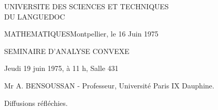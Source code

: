 UNIVERSITE DES SCIENCES ET TECHNIQUES\\
DU LANGUEDOC

MATHEMATIQUES\hfill Montpellier, le 16 Juin 1975

SEMINAIRE D'ANALYSE CONVEXE

Jeudi 19 juin 1975, à 11 h, Salle 431

Mr A. BENSOUSSAN - Professeur, Université Paris IX Dauphine.

Diffusions réfléchies.
